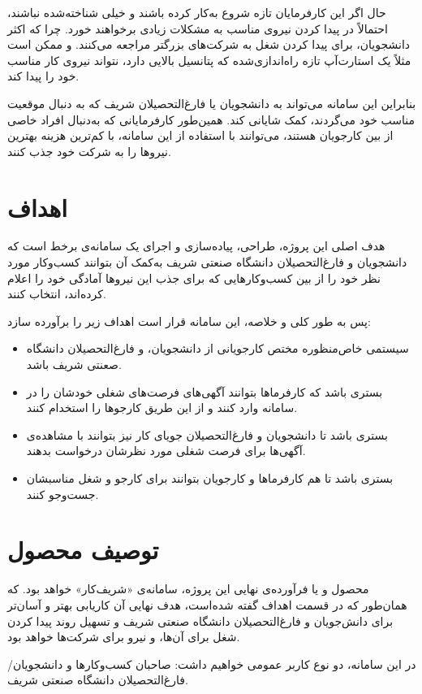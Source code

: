 حال اگر این کارفرمایان تازه شروع به‌کار کرده باشند و خیلی شناخته‌شده نباشند، احتمالاً در پیدا کردن نیروی مناسب به مشکلات زیادی برخواهند خورد. چرا که اکثر دانشجویان، برای پیدا کردن شغل به شرکت‌های بزرگتر مراجعه می‌کنند. و ممکن است مثلاً یک استارت‌آپ تازه راه‌اندازی‌شده که پتانسیل بالایی دارد، نتواند نیروی کار مناسب خود را پیدا کند. 

بنابراین این سامانه می‌تواند به دانشجویان یا فارغ‌التحصیلان شریف که به دنبال موقعیت مناسب خود می‌گردند، کمک شایانی کند. همین‌طور کارفرمایانی که به‌دنبال افراد خاصی از بین کارجویان هستند، می‌توانند با استفاده از این سامانه، با کم‌ترین هزینه بهترین نیروها را به شرکت خود جذب کنند. 


\section{اهداف}
هدف اصلی این پروژه، طراحی، پیاده‌سازی و اجرای یک سامانه‌ی برخط است که دانشجویان و فارغ‌التحصیلان دانشگاه صنعتی شریف به‌کمک آن بتوانند کسب‌و‌کار مورد نظر خود را از بین کسب‌و‌کارهایی که برای جذب این نیروها آمادگی خود را اعلام کرده‌اند، انتخاب کنند. 

پس به طور کلی و خلاصه، این سامانه قرار است اهداف زیر را برآورده سازد:
\begin{itemize}
	\item
	سیستمی خاص‌منظوره مختص کارجویانی از دانشجویان، و فارغ‌التحصیلان دانشگاه صعنتی شریف باشد.
	\item 
	بستری باشد که کارفرماها بتوانند آگهی‌های فرصت‌های شغلی خودشان را در سامانه وارد کنند و از این طریق کارجوها را استخدام کنند.
	\item 
	بستری باشد تا دانشجویان و فارغ‌التحصیلان جویای کار نیز بتوانند با مشاهده‌ی آگهی‌ها برای فرصت شغلی مورد نظرشان درخواست بدهند.
	\item
	بستری باشد تا هم کارفرماها و کارجویان بتوانند برای کارجو و شغل مناسبشان جست‌وجو کنند.
\end{itemize}

\section{توصیف محصول}
محصول و یا فرآورده‌ی نهایی این پروژه، سامانه‌ی «شریف‌کار» خواهد بود. که همان‌طور که در قسمت اهداف گفته شده‌است، هدف نهایی آن کاریابی بهتر و آسان‌تر برای دانش‌جویان و فارغ‌التحصیلان دانشگاه صنعتی شریف و تسهیل روند پیدا کردن شغل برای آن‌ها، و نیرو برای شرکت‌ها خواهد بود. 

در این سامانه، دو نوع کاربر عمومی خواهیم داشت: صاحبان کسب‌و‌کارها و دانشجویان/فارغ‌التحصیلان دانشگاه صنعتی شریف. 

